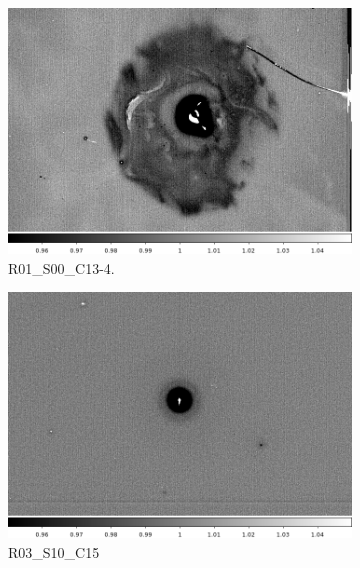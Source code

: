 \begin{figure}[!htbp]
\centering
 \begin{subfigure}{0.3\textwidth}
     \includegraphics[width=\textwidth]{figures/vamp_desc/vamp_desc_ffresp_R01S00.png}
     \caption{R01\_S00\_C13-4.}
     \label{subfig:vamp_desc_R01_S00}
 \end{subfigure}
 \begin{subfigure}{0.3\textwidth}
 \vskip 0pt
     \includegraphics[width=\textwidth]{figures/vamp_desc/vamp_desc_ffresp_R03S10.png} 
     \caption{R03\_S10\_C15}
     \label{subfig:vamp_desc_R03_S10}
 \end{subfigure}  
 \begin{subfigure}{0.3\textwidth}
 \vskip 0pt

\end{subfigure}
\end{figure}
